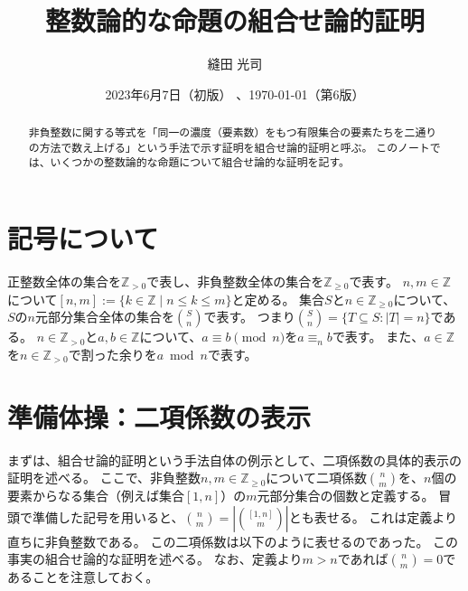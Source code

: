 ﻿\documentclass{ltjsarticle}
\title{整数論的な命題の組合せ論的証明}
\author{縫田 光司}
\date{2023年6月7日（初版）\if0 、\today （第6版）\fi }
\theoremstyle{definition}
\begin{document}
\maketitle
\vspace*{-2em}

\begin{abstract}
    非負整数に関する等式を「同一の濃度（要素数）をもつ有限集合の要素たちを二通りの方法で数え上げる」という手法で示す証明を組合せ論的証明と呼ぶ。
    このノートでは、いくつかの整数論的な命題について組合せ論的な証明を記す。
\end{abstract}


\section*{記号について}

正整数全体の集合を$\mathbb{Z}_{>0}$で表し、非負整数全体の集合を$\mathbb{Z}_{\geq 0}$で表す。
$n,m \in \mathbb{Z}$について$[n,m] := \{ k \in \mathbb{Z} \mid n \leq k \leq m \}$と定める。
集合$S$と$n \in \mathbb{Z}_{\geq 0}$について、$S$の$n$元部分集合全体の集合を$\binom{S}{n}$で表す。
つまり$\binom{S}{n} = \{ T \subseteq S : |T| = n \}$である。
$n \in \mathbb{Z}_{>0}$と$a,b \in \mathbb{Z}$について、$a \equiv b \pmod{n}$を$a \equiv_n b$で表す。
また、$a \in \mathbb{Z}$を$n \in \mathbb{Z}_{>0}$で割った余りを$a \bmod n$で表す。


\section{準備体操：二項係数の表示}

まずは、組合せ論的証明という手法自体の例示として、二項係数の具体的表示の証明を述べる。
ここで、非負整数$n,m \in \mathbb{Z}_{\geq 0}$について二項係数$\binom{n}{m}$を、$n$個の要素からなる集合（例えば集合$[1,n]$）の$m$元部分集合の個数と定義する。
冒頭で準備した記号を用いると、$\binom{n}{m} = | \binom{[1,n]}{m} |$とも表せる。
これは定義より直ちに非負整数である。
この二項係数は以下のように表せるのであった。
この事実の組合せ論的な証明を述べる。
なお、定義より$m > n$であれば$\binom{n}{m} = 0$であることを注意しておく。
\end{document}
